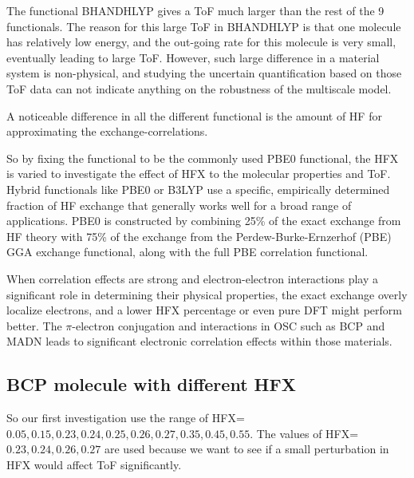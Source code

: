 \documentclass[letterpaper,12pt]{article}
\begin{document}
The functional BHANDHLYP gives a ToF much larger than the rest of the 9 functionals. 
The reason for this large ToF in BHANDHLYP is that one molecule has relatively low energy, and the out-going rate for this molecule is very small, eventually leading to large ToF. 
However, such large difference in a material system is non-physical, and studying the uncertain quantification based on those ToF data can not indicate anything on the robustness of the multiscale model. 

A noticeable difference in all the different functional is the amount of HF for approximating the exchange-correlations. 

So by fixing the functional to be the commonly used PBE0 functional, the HFX is varied to investigate the effect of HFX to the molecular properties and ToF. 
Hybrid functionals like PBE0 or B3LYP use a specific, empirically determined fraction of HF exchange that generally works well for a broad range of applications.
PBE0 is constructed by combining 25\% of the exact exchange from HF theory with 75\% of the exchange from the Perdew-Burke-Ernzerhof (PBE) GGA exchange functional, along with the full PBE correlation functional.

When correlation effects are strong and electron-electron interactions play a significant role in determining their physical properties, the exact exchange overly localize electrons, and a lower HFX percentage or even pure DFT might perform better.
The $\pi$-electron conjugation and interactions in OSC such as BCP and MADN leads to significant electronic correlation effects within those materials. 

\subsection{BCP molecule with different HFX}
So our first investigation use the range of HFX=$0.05,0.15,0.23,0.24,0.25,0.26,0.27,0.35,0.45,0.55$. The values of HFX=$0.23,0.24,0.26,0.27$ are used because we want to see if a small perturbation in HFX would affect ToF significantly. 
\end{document}
